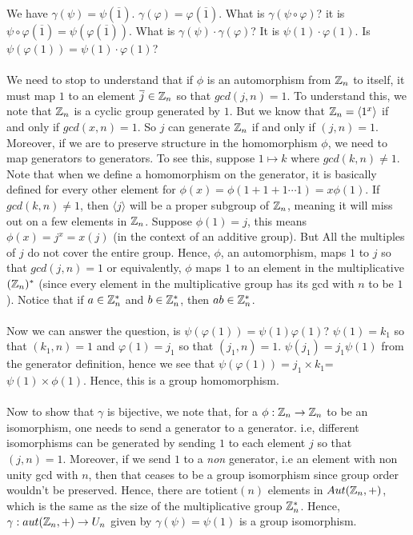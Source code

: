 \documentclass[../Main.tex]{subfiles}
\begin{document}
We have 
$\gamma(\psi)=\psi(\overline{1})$. $\gamma(\varphi)=\varphi(\overline{1})$. What is $\gamma(\psi \circ \varphi)$? it is $\psi \circ \varphi (\overline{1})=\psi(\varphi(\overline{1}))$. What is $\gamma(\psi) \cdot \gamma(\varphi)$? It is $\psi(1) \cdot \varphi(1)$. Is $\psi(\varphi(1))=\psi(1) \cdot \varphi(1)$? 
\\\\ We need to stop to understand that if $\phi$ is an automorphism from $\mathbb Z_n$ to itself, it must map $1$ to an element $\overline{j} \in \mathbb Z_n$ so that $gcd(j,n)=1$. To understand this, we note that $\mathbb Z_n$ is a cyclic group generated by $1$. But we know that $\mathbb Z_n=\langle 1^x \rangle$ if and only if $gcd(x,n)=1$. So $j$ can generate $\mathbb Z_n$ if and only if $(j,n)=1$. Moreover, if we are to preserve structure in the homomorphism $\phi$, we need to map generators to generators. To see this, suppose $1 \mapsto k$ where $gcd(k,n)\neq 1$. Note that when we define a homomorphism on the generator, it is basically defined for every other element for $\phi(x)= \phi(1+1+1 \cdots 1)=x\phi(1)$. If $gcd(k,n)\neq 1$, then $\langle j \rangle $ will be a proper subgroup of $\mathbb Z_n$, meaning it will miss out on a few elements in $\mathbb Z_n$. Suppose $\phi(1)=j$, this means $\phi(x)=j^x= x(j)$ (in the context of an additive group). But All the multiples of $j$ do not cover the entire group. Hence, $\phi$, an automorphism, maps $1$ to $j$ so that $gcd(j,n)=1$ or equivalently, $\phi$ maps $1$ to an element in the multiplicative $(\mathbb Z_n)^{*}$ (since every element in the multiplicative group has its gcd with $n$ to be $1$). Notice that if $a \in \mathbb Z_n^*$ and $b \in \mathbb Z_n^*$, then $ab \in \mathbb Z_n^*$. 
\\\\ Now we can answer the question, is $\psi(\varphi(1))=\psi(1)\varphi(1)$? $\psi(1)=k_1$ so that $(k_1,n)=1$ and $\varphi(1)=j_1$ so that $(j_1,n)=1$. $\psi(j_1)=j_1\psi(1)$ from the generator definition, hence we see that $\psi(\varphi(1))=j_1 \times k_1$=$\psi(1) \times \phi(1)$. Hence, this is a group homomorphism. 
\\\\ Now to show that $\gamma$ is bijective, we note that, for a $\phi: \mathbb Z_n \to \mathbb Z_n$ to be an isomorphism, one needs to send a generator to a generator. i.e, different isomorphisms can be generated by sending $1$ to each element $j$ so that $(j,n)=1$. Moreover, if we send $1$ to a \emph{non} generator, i.e an element with non unity gcd with $n$, then that ceases to be a group isomorphism since group order wouldn't be preserved. Hence, there are $\text{totient}(n)$ elements in $Aut(\mathbb Z_n,+)$, which is the same as the size of the multiplicative group $\mathbb Z_n^{*}$. Hence, $\gamma: aut(\mathbb Z_n,+) \to U_n$ given by $\gamma(\psi)=\psi(1)$ is a group isomorphism.
\end{document}
